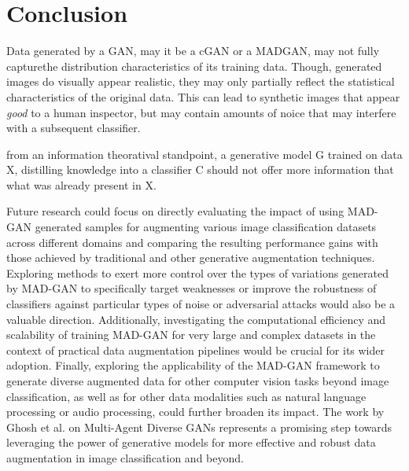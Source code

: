 \section{Conclusion}\label{conclusion}

Data generated by a GAN, may it be a cGAN or a MADGAN, may not fully capturethe distribution characteristics of its training data. Though, generated images do visually appear realistic, they may only partially reflect the statistical characteristics of the original data. This can lead to synthetic images that appear \textit{good} to a human inspector, but may contain amounts of noice that may interfere with a subsequent classifier.

from an information theoratival standpoint, a generative model G trained on data X, distilling knowledge into a classifier C should not offer more information that what was already present in X.


Future research could focus on directly evaluating the impact of using MAD-GAN generated samples for augmenting various image classification datasets across different domains and comparing the resulting performance gains with those achieved by traditional and other generative augmentation techniques. Exploring methods to exert more control over the types of variations generated by MAD-GAN to specifically target weaknesses or improve the robustness of classifiers against particular types of noise or adversarial attacks would also be a valuable direction. Additionally, investigating the computational efficiency and scalability of training MAD-GAN for very large and complex datasets in the context of practical data augmentation pipelines would be crucial for its wider adoption. Finally, exploring the applicability of the MAD-GAN framework to generate diverse augmented data for other computer vision tasks beyond image classification, as well as for other data modalities such as natural language processing or audio processing, could further broaden its impact. The work by Ghosh et al. on Multi-Agent Diverse GANs represents a promising step towards leveraging the power of generative models for more effective and robust data augmentation in image classification and beyond.